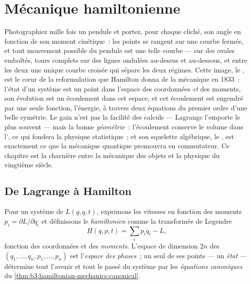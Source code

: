 \chapter{Mécanique hamiltonienne}\label{ch:b3:hamiltonian-mechanics}

Photographiez mille fois un pendule et portez, pour chaque cliché,
son angle en fonction de son moment cinétique~: les points se rangent sur
une courbe fermée, et tout mouvement possible du pendule est une telle
courbe ---  sur des ovales emboîtés, tours complets
sur des lignes ondulées au-dessus et au-dessous, et entre les deux une
unique courbe croisée qui sépare les deux régimes. Cette image, le
\emph{}, est le cœur de la reformulation que Hamilton
donna de la mécanique en 1833~: l'état d'un système est un point dans
l'espace des coordonnées \emph{et} des moments, son évolution est un
écoulement dans cet espace, et cet écoulement est engendré par une
seule fonction, l'énergie, à travers deux équations du premier ordre
d'une belle symétrie. Le gain n'est pas la facilité des calculs ---
Lagrange l'emporte le plus souvent --- mais la bonne
\emph{géométrie}~: l'écoulement conserve le volume dans l', ce qui fondera la physique statistique~; et son squelette
algébrique, le , est exactement ce que la mécanique
quantique promouvra en commutateur. Ce chapitre est la charnière entre
la mécanique des objets et la physique du vingtième siècle.

\section{De Lagrange à Hamilton}

\begin{definition}\label{def:b3:hamiltonian-mechanics:hamiltonian}
Pour un système de  $L(q, \dot q, t)$, exprimons les vitesses
en fonction des moments $p_i = \partial L/\partial\dot q_i$ et
définissons le \emph{hamiltonien} comme la transformée de Legendre
\[
H(q, p, t) = \sum_i p_i\dot q_i - L ,
\]
fonction des coordonnées et des \emph{moments}. L'espace de dimension
$2n$ des $(q_1, \dots, q_n, p_1, \dots, p_n)$ est l'\emph{espace des
phases}~; un seul de ses points --- un \emph{état} --- détermine tout
l'avenir et tout le passé du système par les \emph{équations
canoniques} du
\cref{thm:b3:hamiltonian-mechanics:canonical}.
\end{definition}

